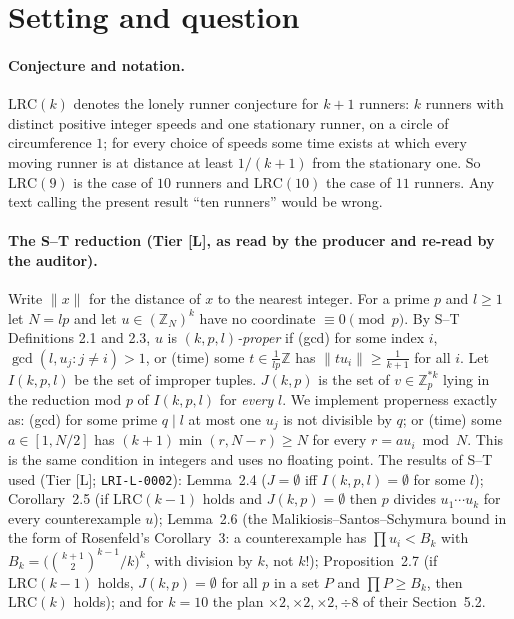 \documentclass[10pt]{article}
\newcommand{\tier}[1]{\textsf{[#1]}}
\newcommand{\tL}{\tier{L}}
\newcommand{\Z}{\mathbb{Z}}
\newcommand{\LRC}[1]{\mathrm{LRC}(#1)}
\begin{document}
\section{Setting and question}\label{sec:setting}
\paragraph{Conjecture and notation.} $\LRC{k}$ denotes the lonely runner conjecture for $k+1$ runners: $k$ runners with distinct positive integer speeds and one stationary runner, on a circle of circumference $1$; for every choice of speeds some time exists at which every moving runner is at distance at least $1/(k+1)$ from the stationary one. So $\LRC{9}$ is the case of $10$ runners and $\LRC{10}$ the case of $11$ runners. Any text calling the present result ``ten runners'' would be wrong.

\paragraph{The S--T reduction (Tier \tL{}, as read by the producer and re-read by the auditor).} Write $\|x\|$ for the distance of $x$ to the nearest integer. For a prime $p$ and $l\ge1$ let $N=lp$ and let $u\in(\Z_N)^k$ have no coordinate $\equiv0\pmod p$.
By S--T Definitions 2.1 and 2.3, $u$ is \emph{$(k,p,l)$-proper} if (gcd) for some index $i$, $\gcd(l,u_j:j\ne i)>1$, or (time) some $t\in\tfrac1{lp}\Z$ has $\|tu_i\|\ge\tfrac1{k+1}$ for all $i$. Let $I(k,p,l)$ be the set of improper tuples. $J(k,p)$ is the set of $v\in\Z_p^{*k}$ lying in the reduction mod $p$ of $I(k,p,l)$ for \emph{every} $l$. We implement properness exactly as: (gcd) for some prime $q\mid l$ at most one $u_j$ is not divisible by $q$; or (time) some $a\in[1,N/2]$ has $(k+1)\min(r,N-r)\ge N$ for every $r=au_i\bmod N$. This is the same condition in integers and uses no floating point.
The results of S--T used (Tier \tL{}; \texttt{LRI-L-0002}): Lemma~2.4 ($J=\emptyset$ iff $I(k,p,l)=\emptyset$ for some $l$); Corollary~2.5 (if $\LRC{k-1}$ holds and $J(k,p)=\emptyset$ then $p$ divides $u_1\cdots u_k$ for every counterexample $u$); Lemma~2.6 (the Malikiosis--Santos--Schymura bound in the form of Rosenfeld's Corollary~3: a counterexample has $\prod u_i<B_k$ with $B_k=\bigl(\binom{k+1}{2}^{k-1}/k\bigr)^k$, with division by $k$, not $k!$); Proposition~2.7 (if $\LRC{k-1}$ holds, $J(k,p)=\emptyset$ for all $p$ in a set $P$ and $\prod P\ge B_k$, then $\LRC{k}$ holds); and for $k=10$ the plan $\times2,\times2,\times2,\div8$ of their Section~5.2.
\end{document}
